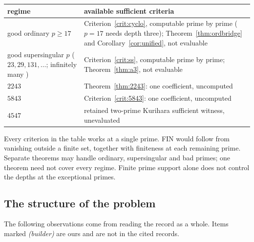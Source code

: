 \begin{center}
\begin{tabular}{@{}p{}p{}@{}}
\toprule
regime & available sufficient criteria\\ \midrule
good ordinary $p\ge17$ & Criterion~\ref{crit:cyclo}, computable prime by prime ($p=17$ needs depth three); Theorem~\ref{thm:ordbridge} and Corollary~\ref{cor:unified}, not evaluable\\
good supersingular $p$ ($23,29,131,\dots$; infinitely many \cite{elkies}) & Criterion~\ref{crit:ss}, computable prime by prime; Theorem~\ref{thm:a3}, not evaluable\\
$2243$ & Theorem~\ref{thm:2243}: one coefficient, uncomputed\\
$5843$ & Criterion~\ref{crit:5843}: one coefficient, uncomputed\\
$4547$ & retained two-prime Kurihara sufficient witness, unevaluated\\ \bottomrule
\end{tabular}
\end{center}
Every criterion in the table works at a single prime. FIN would follow from vanishing outside a finite set, together with finiteness at each remaining prime. Separate theorems may handle ordinary, supersingular and bad primes; one theorem need not cover every regime. Finite prime support alone does not control the depths at the exceptional primes.

\subsection{The structure of the problem}
The following observations come from reading the record as a whole. Items marked \emph{(builder)} are ours and are not in the cited records.

